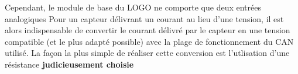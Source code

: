 \documentclass[11pt]{article}
\begin{document}
Cependant, le module de base du LOGO ne comporte que deux entrées analogiques Pour un capteur délivrant un courant au lieu d'une tension, il est alors indispensable de convertir le courant délivré par le capteur en une tension compatible (et le plus adapté possible) avec la plage de fonctionnement du CAN utilisé. 
La façon la plus simple de réaliser cette conversion est l'utlisation d'une résistance \textbf{judicieusement choisie}
\pagebreak
\begin{UPSTIactivite}
	\vspace{7cm}
\end{UPSTIactivite}
\end{document}
